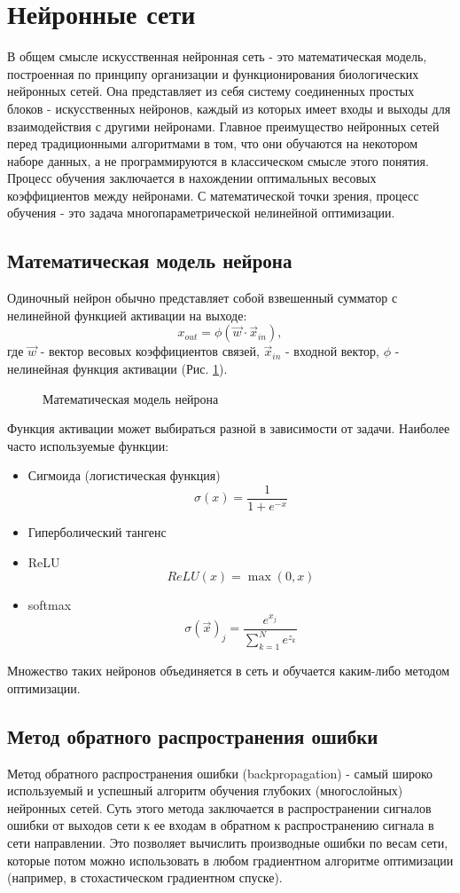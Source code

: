 \clearpage
\section{Нейронные сети}
	В общем смысле искусственная нейронная сеть - это математическая модель, построенная по принципу организации и функционирования биологических нейронных сетей. Она представляет из себя систему соединенных простых блоков - искусственных нейронов, каждый из которых имеет входы и выходы для взаимодействия с другими нейронами. Главное преимущество нейронных сетей перед традиционными алгоритмами в том, что они обучаются на некотором наборе данных, а не программируются в классическом смысле этого понятия. Процесс обучения заключается в нахождении оптимальных весовых коэффициентов между нейронами. С математической точки зрения, процесс обучения - это задача многопараметрической нелинейной оптимизации.
	\subsection{Математическая модель нейрона}
		Одиночный нейрон обычно представляет собой взвешенный сумматор с нелинейной функцией активации на выходе:
		$$x_{out} = \phi(\vec{w} \cdotp \vec{x}_{in}),$$
		где $\vec{w}$ - вектор весовых коэффициентов связей, $\vec{x}_{in}$ - входной вектор, $\phi$ - нелинейная функция активации (Рис. \ref{3-artificial-neuron-model}).
		
		\begin{figure}[h]
			\caption{Математическая модель нейрона}
			\label{3-artificial-neuron-model}
		\end{figure}
		
		Функция активации может выбираться разной в зависимости от задачи. Наиболее часто используемые функции:
		
		\begin{itemize}
			\item Сигмоида (логистическая функция)
					$$\sigma(x) = \frac{1}{1 + e^{-x}}$$
			\item Гиперболический тангенс
			\item ReLU
					$$ReLU(x) = \max(0, x)$$
			\item softmax
					$$\sigma(\vec{x})_j = \frac{e^{x_j}}{\sum_{k=1}^{N} e^{z_k}}$$
		\end{itemize}
		Множество таких нейронов объединяется в сеть и обучается каким-либо методом оптимизации.
	\subsection{Метод обратного распространения ошибки}
		Метод обратного распространения ошибки (backpropagation) - самый широко используемый и успешный алгоритм обучения глубоких (многослойных) нейронных сетей. Суть этого метода заключается в распространении сигналов ошибки от выходов сети к ее входам в обратном к распространению сигнала в сети направлении. Это позволяет вычислить производные ошибки по весам сети, которые потом можно использовать в любом градиентном алгоритме оптимизации (например, в стохастическом градиентном спуске).
		
